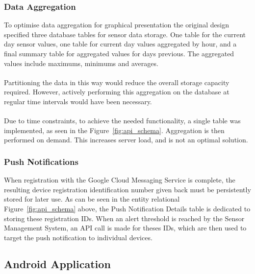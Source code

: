 \documentclass{article}
\begin{document}
\subsubsection{Data Aggregation}
To optimise data aggregation for graphical presentation the original design specified three database tables for sensor data storage. One table for the current day sensor values, one table for current day values aggregated by hour, and a final summary table for aggregated values for days previous. The aggregated values include maximums, minimums and averages. \\\\
Partitioning the data in this way would reduce the overall storage capacity required. However, actively performing this aggregation on the database at regular time intervals would have been necessary.\\\\
Due to time constraints, to achieve the needed functionality, a single table was implemented, as seen in the Figure~\ref{fig:api_schema}. Aggregation is then performed on demand. This increases server load, and is not an optimal solution. 

\subsubsection{Push Notifications}
When registration with the Google Cloud Messaging Service is complete, the resulting device registration identification number given back must be persistently stored for later use. As can be seen in the entity relational Figure~\ref{fig:api_schema} above, the Push Notification Details table is dedicated to storing these registration IDs. When an alert threshold is reached by the Sensor Management System, an API call is made for theses IDs, which are then used to target the push notification to individual devices. 

\newpage
\subsection{Android Application}
\end{document}
